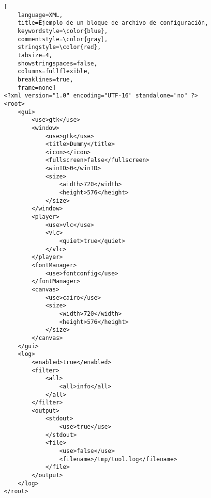 \begin{lstlisting}[
	language=XML,
	title=Ejemplo de un bloque de archivo de configuración,
	keywordstyle=\color{blue},
	commentstyle=\color{gray},
	stringstyle=\color{red},
	tabsize=4,
	showstringspaces=false,
	columns=fullflexible,
	breaklines=true,
	frame=none]
<?xml version="1.0" encoding="UTF-16" standalone="no" ?>
<root>
	<gui>
		<use>gtk</use>
		<window>
			<use>gtk</use>
			<title>Dummy</title>
			<icon></icon>
			<fullscreen>false</fullscreen>
			<winID>0</winID>
			<size>
				<width>720</width>
				<height>576</height>
			</size>
		</window>
		<player>
			<use>vlc</use>
			<vlc>
				<quiet>true</quiet>
			</vlc>
		</player>
		<fontManager>
			<use>fontconfig</use>
		</fontManager>
		<canvas>
			<use>cairo</use>
			<size>
				<width>720</width>
				<height>576</height>
			</size>
		</canvas>
	</gui>
	<log>
		<enabled>true</enabled>
		<filter>
			<all>
				<all>info</all>
			</all>
		</filter>
		<output>
			<stdout>
				<use>true</use>
			</stdout>
			<file>
				<use>false</use>
				<filename>/tmp/tool.log</filename>
			</file>
		</output>
	</log>
</root>
\end{lstlisting}
